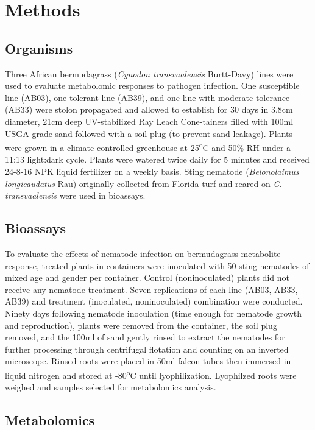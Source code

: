 \documentclass[fleqn,10pt]{wlscirep}
\begin{document}
\section*{Methods}

\subsection*{Organisms}

Three African bermudagrass (\textit{Cynodon transvaalensis} Burtt-Davy) lines were used to evaluate metabolomic responses to pathogen infection.  One susceptible line (AB03), one tolerant line (AB39), and one line with moderate tolerance (AB33) were stolon propagated and allowed to establish for 30 days in 3.8cm diameter, 21cm deep UV-stabilized Ray Leach Cone-tainers filled with 100ml USGA grade sand followed with a soil plug (to prevent sand leakage). Plants were grown in a climate controlled greenhouse at 25\textsuperscript{o}C and 50\% RH under a 11:13 light:dark cycle.  Plants were watered twice daily for 5 minutes and received 24-8-16 NPK liquid fertilizer on a weekly basis.  Sting nematode (\textit{Belonolaimus longicaudatus} Rau) originally collected from Florida turf and reared on \textit{C. transvaalensis} were used in bioassays. 

\subsection*{Bioassays}

To evaluate the effects of nematode infection on bermudagrass metabolite response, treated plants in containers were inoculated with 50 sting nematodes of mixed age and gender per container.  Control (noninoculated) plants did not receive any nematode treatment. Seven replications of each line (AB03, AB33, AB39) and treatment (inoculated, noninoculated) combination were conducted.  Ninety days following nematode inoculation (time enough for nematode growth and reproduction), plants were removed from the container, the soil plug removed, and the 100ml of sand gently rinsed to extract the nematodes for further processing through centrifugal flotation and counting on an inverted microscope.  Rinsed roots were placed in 50ml falcon tubes then immersed in liquid nitrogen and stored at -80\textsuperscript{o}C until lyophilization.  Lyophilzed roots were weighed and samples selected for metabolomics analysis. 

\subsection*{Metabolomics}
\end{document}
